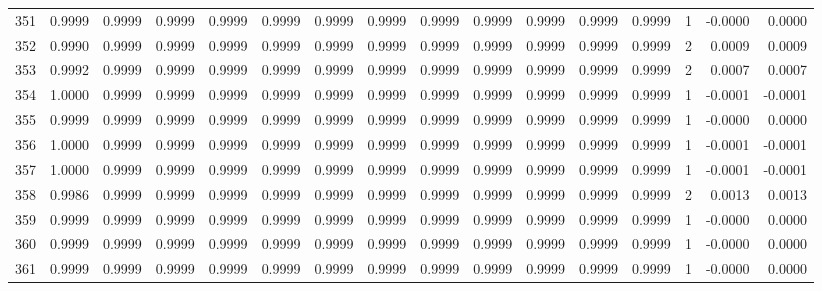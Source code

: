 \begin{tabular}{lrrrrrrrrrrrrrrr}
351 &      0.9999 &  0.9999 &  0.9999 &  0.9999 &  0.9999 &  0.9999 &  0.9999 &  0.9999 &  0.9999 &  0.9999 &   0.9999 &     0.9999 &      1 &                   -0.0000 &                     0.0000 \\
352 &      0.9990 &  0.9999 &  0.9999 &  0.9999 &  0.9999 &  0.9999 &  0.9999 &  0.9999 &  0.9999 &  0.9999 &   0.9999 &     0.9999 &      2 &                    0.0009 &                     0.0009 \\
353 &      0.9992 &  0.9999 &  0.9999 &  0.9999 &  0.9999 &  0.9999 &  0.9999 &  0.9999 &  0.9999 &  0.9999 &   0.9999 &     0.9999 &      2 &                    0.0007 &                     0.0007 \\
354 &      1.0000 &  0.9999 &  0.9999 &  0.9999 &  0.9999 &  0.9999 &  0.9999 &  0.9999 &  0.9999 &  0.9999 &   0.9999 &     0.9999 &      1 &                   -0.0001 &                    -0.0001 \\
355 &      0.9999 &  0.9999 &  0.9999 &  0.9999 &  0.9999 &  0.9999 &  0.9999 &  0.9999 &  0.9999 &  0.9999 &   0.9999 &     0.9999 &      1 &                   -0.0000 &                     0.0000 \\
356 &      1.0000 &  0.9999 &  0.9999 &  0.9999 &  0.9999 &  0.9999 &  0.9999 &  0.9999 &  0.9999 &  0.9999 &   0.9999 &     0.9999 &      1 &                   -0.0001 &                    -0.0001 \\
357 &      1.0000 &  0.9999 &  0.9999 &  0.9999 &  0.9999 &  0.9999 &  0.9999 &  0.9999 &  0.9999 &  0.9999 &   0.9999 &     0.9999 &      1 &                   -0.0001 &                    -0.0001 \\
358 &      0.9986 &  0.9999 &  0.9999 &  0.9999 &  0.9999 &  0.9999 &  0.9999 &  0.9999 &  0.9999 &  0.9999 &   0.9999 &     0.9999 &      2 &                    0.0013 &                     0.0013 \\
359 &      0.9999 &  0.9999 &  0.9999 &  0.9999 &  0.9999 &  0.9999 &  0.9999 &  0.9999 &  0.9999 &  0.9999 &   0.9999 &     0.9999 &      1 &                   -0.0000 &                     0.0000 \\
360 &      0.9999 &  0.9999 &  0.9999 &  0.9999 &  0.9999 &  0.9999 &  0.9999 &  0.9999 &  0.9999 &  0.9999 &   0.9999 &     0.9999 &      1 &                   -0.0000 &                     0.0000 \\
361 &      0.9999 &  0.9999 &  0.9999 &  0.9999 &  0.9999 &  0.9999 &  0.9999 &  0.9999 &  0.9999 &  0.9999 &   0.9999 &     0.9999 &      1 &                   -0.0000 &                     0.0000 \\

\end{tabular}
